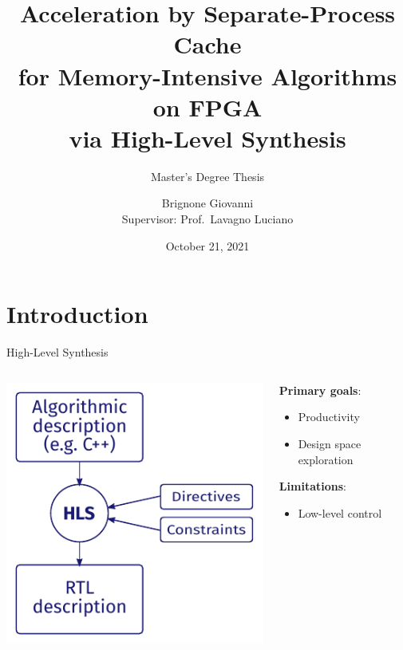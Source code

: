 \documentclass[aspectratio=169]{beamer}
\title{Acceleration by Separate-Process Cache\\for Memory-Intensive Algorithms
on FPGA\\via High-Level Synthesis}
\subtitle{Master's Degree Thesis}
\author{Brignone Giovanni \\ \tiny{Supervisor:} \small{Prof.\ Lavagno Luciano}}
\institute{Politecnico di Torino}
\date{October 21, 2021}
\begin{document}
\begin{frame}
	\maketitle
\end{frame}


{
	\section{Introduction}
}
\begin{frame}{High-Level Synthesis}
	\begin{columns}
		\begin{column}{.45\textwidth}
			\begin{center}
				\includegraphics[height=.7\textheight]{hls}
			\end{center}
		\end{column}
		\begin{column}{.45\textwidth}
			\vfill
			\textbf{Primary goals}:
			\begin{itemize}
				\item Productivity
				\item Design space exploration
			\end{itemize}

			\bigskip
			\textbf{Limitations}:
			\begin{itemize}
				\item Low-level control
			\end{itemize}
			\vfill
		\end{column}
	\end{columns}
\end{frame}
\end{document}
